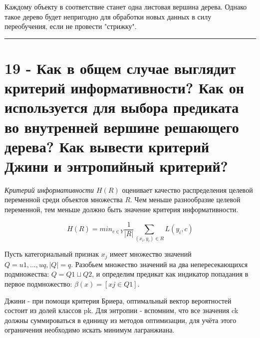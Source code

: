 \documentclass[11pt]{article}
\begin{document}
Каждому объекту в соответствие станет одна листовая вершина дерева.
Однако такое дерево будет непригодно для обработки новых данных в силу
переобучения, если не провести "стрижку".

    \begin{center}\rule{0.5\linewidth}{\linethickness}\end{center}

    \section{19 - Как в общем случае выглядит критерий информативности? Как
он используется для выбора предиката во внутренней вершине решающего
дерева? Как вывести критерий Джини и энтропийный
критерий?}\label{ux43aux430ux43a-ux432-ux43eux431ux449ux435ux43c-ux441ux43bux443ux447ux430ux435-ux432ux44bux433ux43bux44fux434ux438ux442-ux43aux440ux438ux442ux435ux440ux438ux439-ux438ux43dux444ux43eux440ux43cux430ux442ux438ux432ux43dux43eux441ux442ux438-ux43aux430ux43a-ux43eux43d-ux438ux441ux43fux43eux43bux44cux437ux443ux435ux442ux441ux44f-ux434ux43bux44f-ux432ux44bux431ux43eux440ux430-ux43fux440ux435ux434ux438ux43aux430ux442ux430-ux432ux43e-ux432ux43dux443ux442ux440ux435ux43dux43dux435ux439-ux432ux435ux440ux448ux438ux43dux435-ux440ux435ux448ux430ux44eux449ux435ux433ux43e-ux434ux435ux440ux435ux432ux430-ux43aux430ux43a-ux432ux44bux432ux435ux441ux442ux438-ux43aux440ux438ux442ux435ux440ux438ux439-ux434ux436ux438ux43dux438-ux438-ux44dux43dux442ux440ux43eux43fux438ux439ux43dux44bux439-ux43aux440ux438ux442ux435ux440ux438ux439}

\emph{Критерий информативности \(H(R)\)} оценивает качество
распределения целевой переменной среди объектов множества \(R\). Чем
меньше разнообразие целевой переменной, тем меньше должно быть значение
критерия информативности.

\[H(R) = min_{c∈Y}\frac{1}{|R|}\sum_{(x_i,y_i)∈R}L(y_i, c)\]

Пусть категориальный признак \(x_j\) имеет множество значений
\(Q = {u1,...,uq}, |Q| = q\). Разобьем множество значений на два
непересекающихся подмножества: \(Q = Q1⊔Q2\), и определим предикат как
индикатор попадания в первое подмножество: \(β(x) = [xj ∈ Q1]\).

Джини - при помощи критерия Бриера, оптимальный вектор вероятностей
состоит из долей классов pk. Для энтропии - вспомним, что все значения
ck должны суммироваться в единицу из методов оптимизации, для учёта
этого ограничения необходимо искать минимум лагранжиана.
\end{document}

